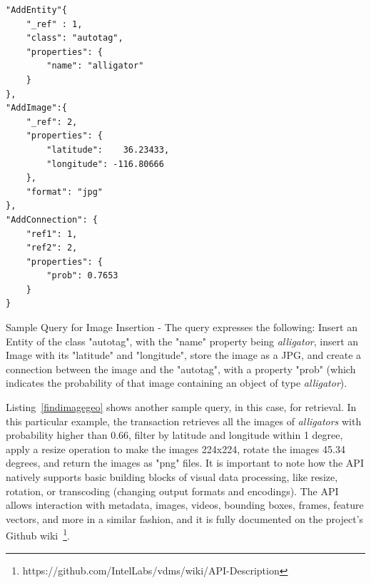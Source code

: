\begin{listing}[ht!]
\begin{verbatim}
"AddEntity"{
    "_ref" : 1,
    "class": "autotag",
    "properties": {
        "name": "alligator"
    }
},
"AddImage":{
    "_ref": 2,
    "properties": {
        "latitude":    36.23433,
        "longitude": -116.80666
    },
    "format": "jpg"
},
"AddConnection": {
    "ref1": 1,
    "ref2": 2,
    "properties": {
        "prob": 0.7653
    }
}

\end{verbatim}
\caption{Sample Query for Image Insertion -
The query expresses the following:
Insert an Entity of the class "autotag", with the "name" property being
\textit{alligator}, insert an Image with its "latitude" and "longitude",
store the image  as a JPG, and create a connection between
the image and the "autotag",  with a property "prob"
(which indicates the probability of that image
containing an object of type  \textit{alligator}).}
\label{addimageandautotag}
\end{listing}

Listing~\ref{findimagegeo} shows another sample query, in this case, for retrieval.
In this particular example, the transaction retrieves all the images
of \textit{alligators} with probability higher than 0.66,
filter by latitude and longitude within 1 degree,
apply a resize operation to make the images 224x224,
rotate the images 45.34 degrees, and return the images as "png" files.
It is important to note how the API natively supports basic building
blocks of visual data processing, like resize, rotation, or transcoding
(changing output formats and encodings).
The API allows interaction with metadata, images, videos, bounding boxes,
frames, feature vectors, and more in a similar fashion,
and it is fully documented on the project's Github
wiki~\footnote{https://github.com/IntelLabs/vdms/wiki/API-Description}.

